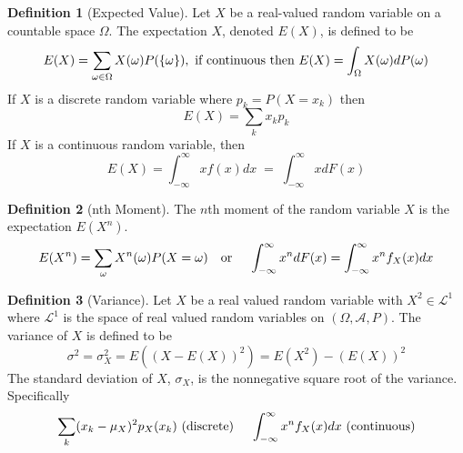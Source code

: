\documentclass{article}
\theoremstyle{definition}
\newtheorem{definition}{Definition}[section]
\theoremstyle{remark}
\begin{document}
\vspace{.5cm}






\begin{definition}[Expected Value]\label{def:expected value}
Let $X$ be a real-valued random variable on a countable space $\Omega$. The expectation $X$, denoted $E(X)$, is defined to be 
\[
    E(X) = \sum_{\omega \in \Omega}{X(\omega)P(\{\omega\})}, \textnormal{ if continuous then }  E(X) = \int_\Omega{X(\omega)dP(\omega)}
\]
If $X$ is a discrete random variable where $p_k = P(X=x_k)$ then
\[
E(X) = \sum_k{x_kp_k}
\]
If $X$ is a continuous random variable, then 
\[
E(X) = \int_{-\infty}^{\infty}{xf(x)dx} \;  = \; \int_{-\infty}^{\infty}{xdF(x)}
\]

\end{definition}




\vspace{.5cm}




\begin{definition}[nth Moment]
The $n$th moment of the random variable $X$ is the expectation $E(X^n)$. 
\[
E(X^n) = \sum_{\omega}{X^n(\omega)P(X = \omega)} \quad \textnormal{or } \quad \int_{-\infty}^{\infty}x^ndF(x) = \int_{-\infty}^{\infty} x^n f_X (x) dx
\]
\end{definition}



\vspace{.5cm}




\begin{definition}[Variance]\label{def: Variance and Standard Deviation}
Let $X$ be a real valued random variable with $X^2 \in \mathcal{L}^1$ where $\mathcal{L}^1$ is the space of real valued random variables on $(\Omega, \mathcal{A}, P)$. The variance of $X$ is defined to be
\[
\sigma^2 = \sigma^2_X = E((X - E(X))^2) = E(X^2) - (E(X))^2 
\]
The standard deviation of $X$, $\sigma_X$, is the nonnegative square root of the variance. Specifically
\[
    \sum_{k} (x_k - \mu_X )^2 p_X (x_k) \textnormal{ (discrete) } \quad \int_{-\infty}^{\infty} x^n f_X (x) dx \textnormal{ (continuous)}
\]

\end{definition}


\vspace{.5cm}
\end{document}
